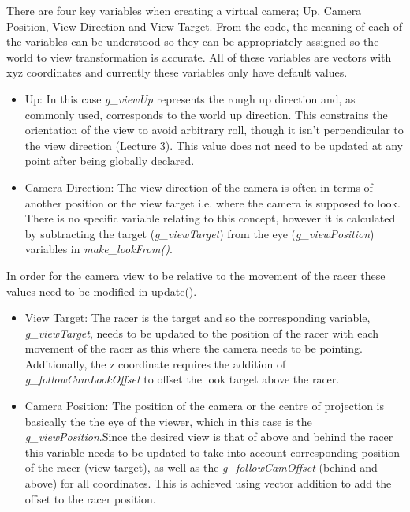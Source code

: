 \documentclass[a4 paper, 12pt]{article}
\begin{document}
There are four key variables when creating a virtual camera; Up, Camera Position, View Direction and View Target. From the code, the meaning of each of the variables can be understood so they can be appropriately assigned so the world to view transformation is accurate. All of these variables are vectors with xyz coordinates and currently these variables only have default values.
    \begin{itemize}
        \item Up: In this case \textit{g\_viewUp} represents the rough up direction and, as commonly used, corresponds to the world up direction. This constrains the orientation of the view to avoid arbitrary roll, though it isn't perpendicular to the view direction (Lecture 3). This value does not need to be updated at any point after being globally declared.
        \item Camera Direction: The view direction of the camera is often in terms of another position or the view target i.e. where the camera is supposed to look. There is no specific variable relating to this concept, however it is calculated by subtracting the target (\textit{g\_viewTarget}) from the eye (\textit{g\_viewPosition}) variables in \textit{make\_lookFrom()}.
    \end{itemize}

In order for the camera view to be relative to the movement of the racer these values need to be modified in update().
    \begin{itemize}
        \item View Target: The racer is the target and so the corresponding variable, \textit{{}g\_viewTarget}, needs to be updated to the position of the racer with each movement of the racer as this where the camera needs to be pointing. Additionally, the z coordinate requires the addition of \textit{g\_followCamLookOffset} to offset the look target above the racer. 
        \item Camera Position: The position of the camera or the centre of projection is basically the the eye of the viewer, which in this case is the \textit{g\_viewPosition}.Since the desired view is that of above and behind the racer this variable needs to be updated to take into account corresponding position of the racer (view target), as well as the \textit{g\_followCamOffset} (behind and above) for all coordinates. This is achieved using vector addition to add the offset to the racer position.
    \end{itemize} 
\end{document}
